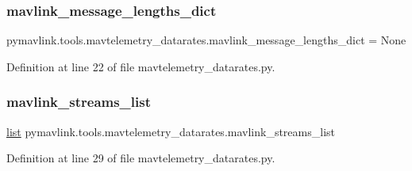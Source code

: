 \subsubsection{\texorpdfstring{mavlink\_message\_lengths\_dict}{mavlink\_message\_lengths\_dict}}
{\footnotesize\ttfamily pymavlink.\+tools.\+mavtelemetry\+\_\+datarates.\+mavlink\+\_\+message\+\_\+lengths\+\_\+dict = None}



Definition at line 22 of file mavtelemetry\+\_\+datarates.\+py.

\mbox{\label{namespacepymavlink_1_1tools_1_1mavtelemetry__datarates_a62bdc6d64839990912e370e2b7c2305c}} 
\subsubsection{\texorpdfstring{mavlink\_streams\_list}{mavlink\_streams\_list}}
{\footnotesize\ttfamily \mbox{\hyperlink{structlist}{list}} pymavlink.\+tools.\+mavtelemetry\+\_\+datarates.\+mavlink\+\_\+streams\+\_\+list}



Definition at line 29 of file mavtelemetry\+\_\+datarates.\+py.

